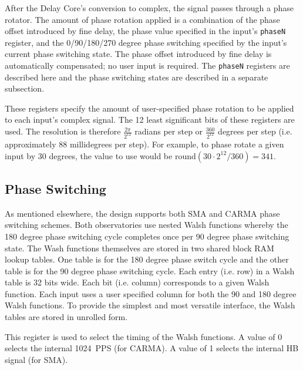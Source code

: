 \documentclass[12pt]{article}
\begin{document}
After the Delay Core's conversion to complex, the signal passes through a phase
rotator.  The amount of phase rotation applied is a combination of the phase
offset introduced by fine delay, the phase value specified in the input's
\verb|phaseN| register, and the 0/90/180/270 degree phase switching specified
by the input's current phase switching state.  The phase offset introduced by
fine delay is automatically compensated; no user input is required.  The
\verb|phaseN| registers are described here and the phase switching states are
described in a separate subsection.

\begin{description}

 These registers specify the amount of user-specified phase
rotation to be applied to each input's complex signal.  The 12 least
significant bits of these registers are used.  The resolution is therefore
$\frac{2 \pi}{2^{12}}$ radians per step or $\frac{360}{2^{12}}$ degrees per
step (i.e. approximately 88 millidegrees per step).  For example, to phase
rotate a given input by 30 degrees, the value to use would be
$\mathrm{round}(30 \cdot 2^{12} / 360) = 341$.

\end{description}

  \subsection{Phase Switching}

As mentioned elsewhere, the design supports both SMA and CARMA phase switching
schemes.  Both observatories use nested Walsh functions whereby the 180 degree
phase switching cycle completes once per 90 degree phase switching state.  The
Wash functions themselves are stored in two shared block RAM lookup tables.
One table is for the 180 degree phase switch cycle and the other table is for
the 90 degree phase switching cycle.  Each entry (i.e. row) in a Walsh table is
32 bits wide.  Each bit (i.e. column) corresponds to a given Walsh function.
Each input uses a user specified column for both the 90 and 180 degree Walsh
functions.  To provide the simplest and most versatile interface, the Walsh
tables are stored in unrolled form.

\begin{description}

 This register is used to select the timing of the Walsh functions.  A value of 0 selects the internal 1024~PPS (for CARMA).  A value of 1 selects the internal HB signal (for SMA).

\end{description}
\end{document}
